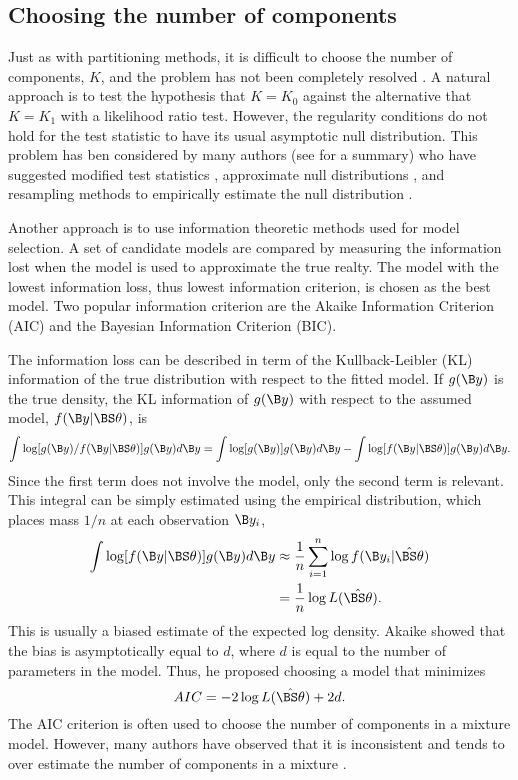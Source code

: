 \subsection{Choosing the number of components}
Just as with partitioning methods, it is difficult to choose the number of components, $K$, and the problem has not been completely resolved \cite{mclachlan2000}. A natural approach is to test the hypothesis that $K=K_{0}$ against the alternative that $K=K_{1}$ with a likelihood ratio test. However, the regularity conditions do not hold for the test statistic to have its usual asymptotic null distribution. This problem has ben considered by many authors (see \textcite{mclachlan2000} for a summary) who have suggested modified test statistics \cite{wolfe1971}, approximate null distributions \cite{lo2001}, and resampling methods to empirically estimate the null distribution \cite{mclachlan1987}.

Another approach is to use information theoretic methods used for model selection. A set of candidate models are compared by measuring the information lost when the model is used to approximate the true realty. The model with the lowest information loss, thus lowest information criterion, is chosen as the best model. Two popular information criterion are the Akaike Information Criterion (AIC) and the Bayesian Information Criterion (BIC). 

The information loss can be described in term of the Kullback-Leibler (KL) information \cite{kullback1951} of the true distribution with respect to the fitted model. If $g(\B y)$ is the true density, the KL information of $g(\B y)$ with respect to the assumed model, $f(\B y|\BS \theta)$, is
$$\int \log[g(\B y)/f(\B y|\BS\theta)]g(\B y)d\B y=\int \log[g(\B y)]g(\B y)d\B y-\int \log[f(\B y|\BS\theta)]g(\B y)d\B y.$$
Since the first term does not involve the model, only the second term is relevant. This integral can be simply estimated using the empirical distribution, which places mass $1/n$ at each observation $\B y_{i}$,
\begin{align*}
\int \log[f(\B y|\BS\theta)]g(\B y)d\B y &\approx \frac{1}{n} \sum^{n}_{i=1}\log f(\B y_{i}|\hat{\BS\theta})\\
&=\frac{1}{n} \log L(\hat{\BS\theta}).
\end{align*}
This is usually a biased estimate of the expected log density. Akaike \cite{akaike1973,akaike1974} showed that the bias is asymptotically equal to $d$, where $d$ is equal to the number of parameters in the model. Thus, he proposed choosing a model that minimizes
$$AIC = -2\log L(\hat{\BS\theta}) + 2d.$$
The AIC criterion is often used to choose the number of components in a mixture model. However, many authors have observed that it is inconsistent \cite{koehler1988} and tends to over estimate the number of components in a mixture \cite{soromenho1994,celeux1996}.


